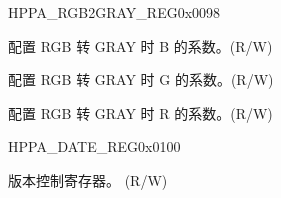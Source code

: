 \begin{register}{H}{PPA\_RGB2GRAY\_REG}{0x0098}\label{regdesc:PPARGB2GRAYREG}
%
%
%
%
\regnewline%
\begin{regdesc}\begin{reglist}
\label{fielddesc:PPARGB2GRAYB}\item [PPA\_RGB2GRAY\_B] 配置 RGB 转 GRAY 时 B 的系数。(R/W)
\label{fielddesc:PPARGB2GRAYG}\item [PPA\_RGB2GRAY\_G] 配置 RGB 转 GRAY 时 G 的系数。(R/W)
\label{fielddesc:PPARGB2GRAYR}\item [PPA\_RGB2GRAY\_R] 配置 RGB 转 GRAY 时 R 的系数。(R/W)
\end{reglist}\end{regdesc}
\end{register}


\begin{register}{H}{PPA\_DATE\_REG}{0x0100}\label{regdesc:PPADATEREG}
%
\regnewline%
\begin{regdesc}\begin{reglist}
\label{fielddesc:PPADATE}\item [PPA\_DATE] 版本控制寄存器。 (R/W)
\end{reglist}\end{regdesc}
\end{register}
